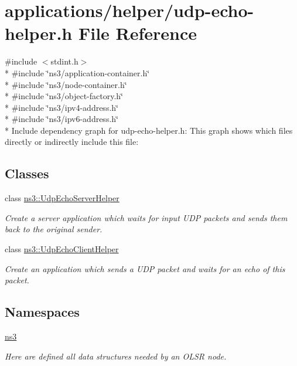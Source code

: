 \hypertarget{udp-echo-helper_8h}{}\section{applications/helper/udp-\/echo-\/helper.h File Reference}
\label{udp-echo-helper_8h}
{\ttfamily \#include $<$stdint.\+h$>$}\\*
{\ttfamily \#include \char`\"{}ns3/application-\/container.\+h\char`\"{}}\\*
{\ttfamily \#include \char`\"{}ns3/node-\/container.\+h\char`\"{}}\\*
{\ttfamily \#include \char`\"{}ns3/object-\/factory.\+h\char`\"{}}\\*
{\ttfamily \#include \char`\"{}ns3/ipv4-\/address.\+h\char`\"{}}\\*
{\ttfamily \#include \char`\"{}ns3/ipv6-\/address.\+h\char`\"{}}\\*
Include dependency graph for udp-\/echo-\/helper.h\+:
This graph shows which files directly or indirectly include this file\+:
\subsection*{Classes}
\begin{DoxyCompactItemize}
\item 
class \hyperlink{classns3_1_1UdpEchoServerHelper}{ns3\+::\+Udp\+Echo\+Server\+Helper}
\begin{DoxyCompactList}\small\item\em Create a server application which waits for input U\+DP packets and sends them back to the original sender. \end{DoxyCompactList}\item 
class \hyperlink{classns3_1_1UdpEchoClientHelper}{ns3\+::\+Udp\+Echo\+Client\+Helper}
\begin{DoxyCompactList}\small\item\em Create an application which sends a U\+DP packet and waits for an echo of this packet. \end{DoxyCompactList}\end{DoxyCompactItemize}
\subsection*{Namespaces}
\begin{DoxyCompactItemize}
\item 
 \hyperlink{namespacens3}{ns3}
\begin{DoxyCompactList}\small\item\em Here are defined all data structures needed by an O\+L\+SR node. \end{DoxyCompactList}\end{DoxyCompactItemize}
